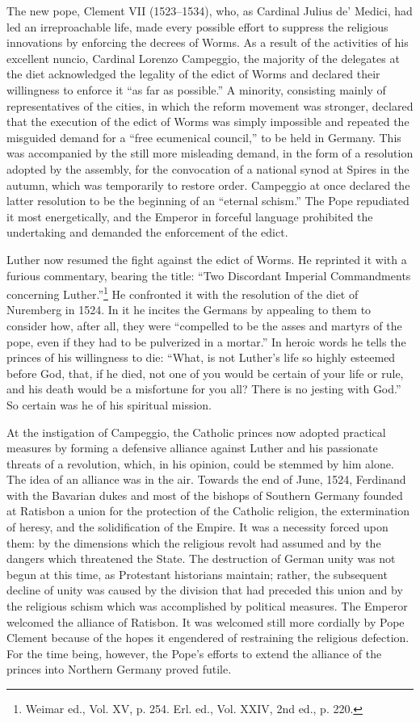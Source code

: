 The new pope, Clement VII (1523--1534), who, as Cardinal Julius
de’ Medici, had led an irreproachable life, made every possible effort
to suppress the religious innovations by enforcing the decrees of
Worms. As a result of the activities of his excellent nuncio, Cardinal
Lorenzo Campeggio, the majority of the delegates at the diet
acknowledged the legality of the edict of Worms and declared their
willingness to enforce it “as far as possible.” A minority, consisting
mainly of representatives of the cities, in which the reform movement
was stronger, declared that the execution of the edict of
Worms was simply impossible and repeated the misguided demand
for a “free ecumenical council,” to be held in Germany. This was
accompanied by the still more misleading demand, in the form of a
resolution adopted by the assembly, for the convocation of a national
synod at Spires in the autumn, which was temporarily to restore
order. Campeggio at once declared the latter resolution to be the
beginning of an “eternal schism.” The Pope repudiated it most
energetically, and the Emperor in forceful language prohibited the
undertaking and demanded the enforcement of the edict.

Luther now resumed the fight against the edict of Worms. He
reprinted it with a furious commentary, bearing the title: “Two
Discordant Imperial Commandments concerning Luther.”\footnote
{Weimar ed., Vol. XV, p. 254. Erl. ed., Vol. XXIV, 2nd ed., p. 220.}
He confronted it with the resolution of the diet of Nuremberg in 1524. In
it he incites the Germans by appealing to them to consider how, after
all, they were “compelled to be the asses and martyrs of the pope,
even if they had to be pulverized in a mortar.” In heroic words he
tells the princes of his willingness to die: “What, is not Luther’s
life so highly esteemed before God, that, if he died, not one of you
would be certain of your life or rule, and his death would be a
misfortune for you all? There is no jesting with God.” So certain
was he of his spiritual mission.

At the instigation of Campeggio, the Catholic princes now adopted
practical measures by forming a defensive alliance against Luther
and his passionate threats of a revolution, which, in his opinion, could
be stemmed by him alone. The idea of an alliance was in the air.
Towards the end of June, 1524, Ferdinand with the Bavarian dukes
and most of the bishops of Southern Germany founded at Ratisbon
a union for the protection of the Catholic religion, the extermination
of heresy, and the solidification of the Empire. It was a necessity
forced upon them: by the dimensions which the religious revolt had
assumed and by the dangers which threatened the State. The destruction
of German unity was not begun at this time, as Protestant historians
maintain; rather, the subsequent decline of unity was caused
by the division that had preceded this union and by the religious
schism which was accomplished by political measures. The Emperor
welcomed the alliance of Ratisbon. It was welcomed still more cordially
by Pope Clement because of the hopes it engendered of restraining the religious
defection. For the time being, however, the Pope’s
efforts to extend the alliance of the princes into Northern Germany
proved futile.

